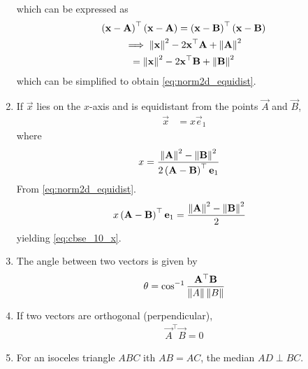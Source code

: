 \begin{enumerate}[label=\thesection.\arabic*.,ref=\thesection.\theenumi]
\begin{align}
\end{align}
which can be expressed as 
\begin{multline}
	\left(\mathbf{x}-\mathbf{A}\right)^{\top} \left(\mathbf{x}-\mathbf{A}\right)=
	\left(\mathbf{x}-\mathbf{B}\right)^{\top} 
\left(\mathbf{x}-\mathbf{B}\right)
\\
	\implies	\left\lVert\mathbf{x}\right\rVert^2-2{\mathbf{x}}^{\top}\mathbf{A} + \left\lVert\mathbf{A}\right\rVert^2
	\\= \left\lVert\mathbf{x}\right\rVert^2-2{\mathbf{x}}^{\top}\mathbf{B} + \left\lVert\mathbf{B}\right\rVert^2
\end{multline}
which can be simplified to obtain
  \eqref{eq:norm2d_equidist}.
\item If $\vec{x}$ lies on the  $x$-axis and is  equidistant from the points $\vec{A}$ and $\vec{B}$, 
  \begin{align}
	  \vec{x} &=
	   x\vec{e}_1
  \end{align}
  where 
  \begin{align}
	  x &=\frac{\norm{\vec{A}}^2 -\norm{\vec{B}}^2 }{2\brak{\vec{A}-\vec{B}}^{\top }\vec{e}_1
}
	  \label{eq:cbse_10_x}
  \end{align}
  \solution 
  From \eqref{eq:norm2d_equidist}.
  \begin{align}
	   x\left(\mathbf{A}-\mathbf{B}\right)^{\top }\mathbf{e}_1
		  &=
	  \frac{\left\lVert\mathbf{A}\right\rVert^2 -\left\lVert\mathbf{B}\right\rVert^2 }{2}
   \end{align}
	  yielding \eqref{eq:cbse_10_x}.
  \item The angle between two vectors is given by 
    \label{prop:angle2d}
  \begin{align}
    \label{eq:angle2d}
    \theta = \cos^{-1}\frac{\vec{A}^{\top} \vec{B}}{\norm{A}\norm{B}}
  \end{align}
  \item If two vectors are orthogonal (perpendicular), 
  \begin{align}
    \label{eq:angle2d_orth}
\vec{A}^{\top} \vec{B} = 0
  \end{align}
  \item For an isoceles triangle $ABC$ ith $AB = AC$, the median $AD \perp BC$.
    \label{prop:two-isosc}


\end{enumerate}
